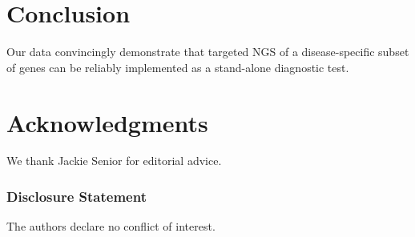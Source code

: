 \section{Conclusion}
Our data convincingly demonstrate that targeted NGS of a disease-specific subset of genes can be reliably implemented as a stand-alone diagnostic test.

\section*{Acknowledgments}\label{Acknowledgments} 
We thank Jackie Senior for editorial advice.


\subsubsection{Disclosure Statement} 
The authors declare no conflict of interest.

